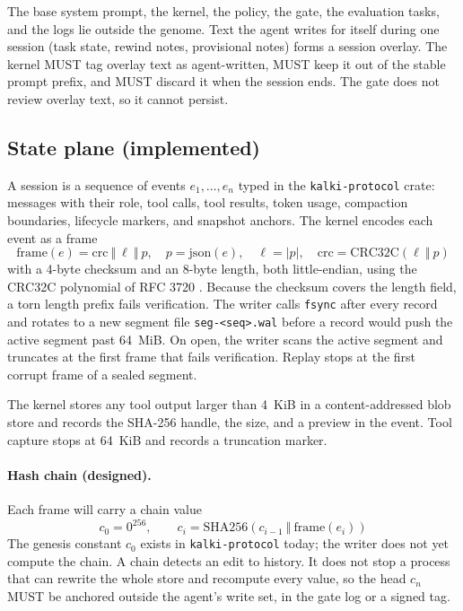 \documentclass[11pt,a4paper]{article}
\begin{document}
The base system prompt, the kernel, the policy, the gate, the evaluation tasks, and the logs lie outside the genome. Text the agent writes for itself during one session (task state, rewind notes, provisional notes) forms a session overlay. The kernel MUST tag overlay text as agent-written, MUST keep it out of the stable prompt prefix, and MUST discard it when the session ends. The gate does not review overlay text, so it cannot persist.

\subsection{State plane (implemented)}

A session is a sequence of events $e_1,\ldots,e_n$ typed in the \texttt{kalki-protocol} crate: messages with their role, tool calls, tool results, token usage, compaction boundaries, lifecycle markers, and snapshot anchors. The kernel encodes each event as a frame
\begin{equation}
\mathrm{frame}(e) = \mathrm{crc}\ \Vert\ \ell\ \Vert\ p,\quad p=\mathrm{json}(e),\quad \ell=|p|,\quad \mathrm{crc}=\mathrm{CRC32C}(\ell\ \Vert\ p)
\label{eq:frame}
\end{equation}
with a 4-byte checksum and an 8-byte length, both little-endian, using the CRC32C polynomial of RFC 3720 \citep{rfc3720}. Because the checksum covers the length field, a torn length prefix fails verification. The writer calls \texttt{fsync} after every record and rotates to a new segment file \texttt{seg-<seq>.wal} before a record would push the active segment past 64~MiB. On open, the writer scans the active segment and truncates at the first frame that fails verification. Replay stops at the first corrupt frame of a sealed segment.

The kernel stores any tool output larger than 4~KiB in a content-addressed blob store and records the SHA-256 handle, the size, and a preview in the event. Tool capture stops at 64~KiB and records a truncation marker.

\paragraph{Hash chain (designed).} Each frame will carry a chain value
\begin{equation}
c_0 = 0^{256},\qquad c_i=\mathrm{SHA256}(c_{i-1}\ \Vert\ \mathrm{frame}(e_i))
\label{eq:chain}
\end{equation}
The genesis constant $c_0$ exists in \texttt{kalki-protocol} today; the writer does not yet compute the chain. A chain detects an edit to history. It does not stop a process that can rewrite the whole store and recompute every value, so the head $c_n$ MUST be anchored outside the agent's write set, in the gate log or a signed tag.
\end{document}
